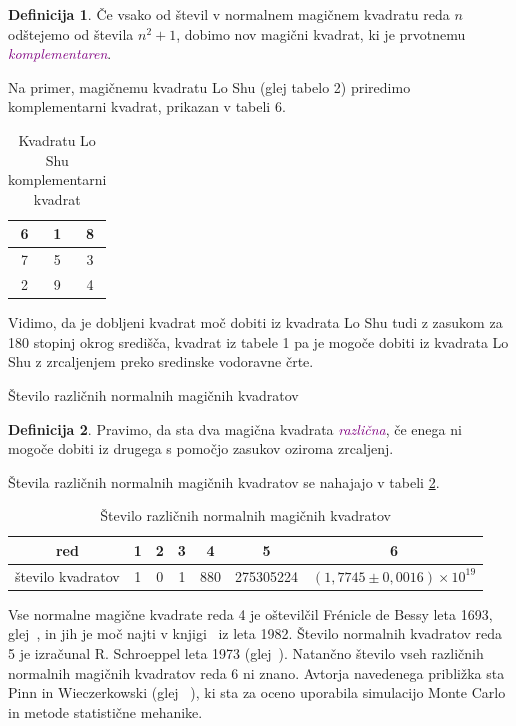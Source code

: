 \documentclass[a4paper,12pt]{article}
\theoremstyle{definition}
\newtheorem{definicija}{Definicija}
\theoremstyle{plain}
\newcommand{\pojem}[1]{\textcolor{purple}{\emph{#1}}}
\begin{document}
\begin{definicija}
      Če vsako od števil v normalnem magičnem kvadratu reda $n$ odštejemo
      od števila $n^2+1$, dobimo nov magični kvadrat, ki je prvotnemu
      \pojem{komplementaren}.
\end{definicija}

Na primer, magičnemu kvadratu Lo Shu (glej tabelo 2) priredimo
komplementarni kvadrat, prikazan v tabeli 6.

\begin{table}[!ht]
   \centering
   \caption{Kvadratu Lo Shu komplementarni kvadrat}
   \label{table:closhu}
   \begin{tabular}{|c|c|c|}
       \hline
       6 & 1 & 8 \\\hline
       7 & 5 & 3 \\\hline
       2 & 9 & 4 \\\hline
   \end{tabular}
\end{table}
Vidimo, da je dobljeni kvadrat moč dobiti iz kvadrata Lo Shu tudi z zasukom za
180 stopinj okrog središča, kvadrat iz tabele 1 pa je mogoče dobiti
iz kvadrata Lo Shu z zrcaljenjem preko sredinske vodoravne črte.

Število različnih normalnih magičnih kvadratov

\begin{definicija}
      Pravimo, da sta dva magična kvadrata \pojem{različna}, če enega ni mogoče dobiti
      iz drugega s pomočjo zasukov oziroma zrcaljenj.
\end{definicija}

Števila različnih normalnih magičnih kvadratov se nahajajo v tabeli \ref{table:stevila}.

\begin{table}[ht]
   \centering
   \caption{Število različnih normalnih magičnih kvadratov}
   \label{table:stevila} %
   \begin{tabular}{@{}ccccccc@{}}
       \toprule
       {red}              & 1  & 2  & 3   & 4   & 5          & 6                              \\ \midrule
       {število kvadratov} & 1  & 0  & 1   & 880 & 275305224 & \( (1,7745 \pm 0,0016) \times 10^{19} \) \\ \bottomrule
   \end{tabular}
\end{table}

Vse normalne magične kvadrate reda 4 je oštevilčil Frénicle de Bessy
leta 1693, glej~\cite{bessy}, in jih je moč najti v knjigi~\cite{berlekamp}
iz leta 1982. Število normalnih kvadratov reda 5 je izračunal
R. Schroeppel leta 1973 (glej~\cite{gardner}).
Natančno število vseh različnih normalnih magičnih kvadratov reda 6 ni znano.
Avtorja navedenega približka sta Pinn in Wieczerkowski (glej ~\cite{pinn}), ki
sta za oceno uporabila simulacijo Monte Carlo in metode statistične mehanike.
\end{document}
